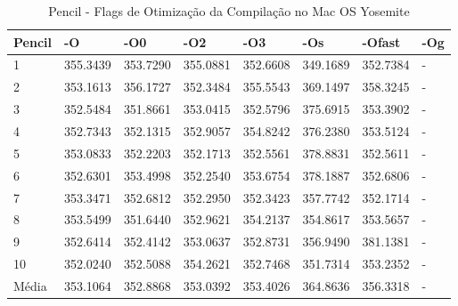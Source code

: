 \begin{table}[!ht]
\centering
\tiny
\caption{Pencil - Flags de Otimização da Compilação no Mac OS Yosemite}
\label{tab:otimizacao_compilacao:mac:pencil}
\begin{tabular}{llllllll}
\textbf{Pencil}         & \textbf{-O}  & \textbf{-O0}   & \textbf{-O2} & \textbf{-O3} & \textbf{-Os} & \textbf{-Ofast} & \textbf{-Og} \\ \toprule
1                       & 355.3439     &   353.7290     &    355.0881  &    352.6608  &   349.1689   &   352.7384      &  -           \\ 
2                       & 353.1613     &   356.1727     &    352.3484  &    355.5543  &   369.1497   &   358.3245      &  -           \\ 
3                       & 352.5484     &   351.8661     &    353.0415  &    352.5796  &   375.6915   &   353.3902      &  -           \\ 
4                       & 352.7343     &   352.1315     &    352.9057  &    354.8242  &   376.2380   &   353.5124      &  -           \\ 
5                       & 353.0833     &   352.2203     &    352.1713  &    352.5561  &   378.8831   &   352.5611      &  -           \\ 
6                       & 352.6301     &   353.4998     &    352.2540  &    353.6754  &   378.1887   &   352.6806      &  -           \\ 
7                       & 353.3471     &   352.6812     &    352.2950  &    352.3423  &   357.7742   &   352.1714      &  -           \\ 
8                       & 353.5499     &   351.6440     &    352.9621  &    354.2137  &   354.8617   &   353.5657      &  -           \\ 
9                       & 352.6414     &   352.4142     &    353.0637  &    352.8731  &   356.9490   &   381.1381      &  -           \\ 
10                      & 352.0240     &   352.5088     &    354.2621  &    352.7468  &   351.7314   &   353.2352      &  -           \\ \bottomrule
Média                   & 353.1064     &   352.8868     &    353.0392  &    353.4026  &   364.8636   &   356.3318      &  -           \\ 
\end{tabular}
\end{table}

